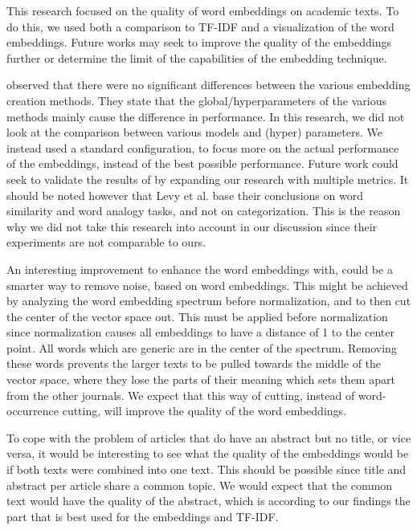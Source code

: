 \documentclass[../../Thesis.tex]{subfiles}
\begin{document}
This research focused on the quality of word embeddings on academic texts. To do this, we used both a comparison to TF-IDF and a visualization of the word embeddings. Future works may seek to improve the quality of the embeddings further or determine the limit of the capabilities of the embedding technique. 

\citet{levy2015improving} observed that there were no significant differences between the various embedding creation methods. They state that the global/hyperparameters of the various methods mainly cause the difference in performance. In this research, we did not look at the comparison between various models and (hyper) parameters. We instead used a standard configuration, to focus more on the actual performance of the embeddings, instead of the best possible performance. Future work could seek to validate the results of \citet{levy2015improving} by expanding our research with multiple metrics. It should be noted however that Levy et al. base their conclusions on word similarity and word analogy tasks, and not on categorization. This is the reason why we did not take this research into account in our discussion since their experiments are not comparable to ours.

An interesting improvement to enhance the word embeddings with, could be a smarter way to remove noise, based on word embeddings. This might be achieved by analyzing the word embedding spectrum before normalization, and to then cut the center of the vector space out. This must be applied before normalization since normalization causes all embeddings to have a distance of 1 to the center point. All words which are generic are in the center of the spectrum. Removing these words prevents the larger texts to be pulled towards the middle of the vector space, where they lose the parts of their meaning which sets them apart from the other journals. We expect that this way of cutting, instead of word-occurrence cutting, will improve the quality of the word embeddings.

To cope with the problem of articles that do have an abstract but no title, or vice versa, it would be interesting to see what the quality of the embeddings would be if both texts were combined into one text. This should be possible since title and abstract per article share a common topic. We would expect that the common text would have the quality of the abstract, which is according to our findings the part that is best used for the embeddings and TF-IDF.
\end{document}
